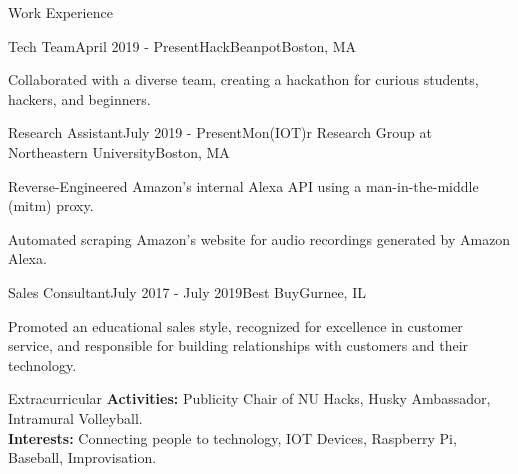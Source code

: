 \documentclass{resume}
\begin{document}
\begin{rSection}{Work Experience}

\begin{rSubsection}{Tech Team}{April 2019 - Present}{HackBeanpot}{Boston, MA}
\item Collaborated with a diverse team, creating a hackathon for curious students, hackers, and beginners.
\end{rSubsection}

\begin{rSubsection}{Research Assistant}{July 2019 - Present}{Mon(IOT)r Research Group at Northeastern University}{Boston, MA}
\item Reverse-Engineered Amazon's internal Alexa API using a man-in-the-middle (mitm) proxy. 
\item Automated scraping Amazon's website for audio recordings generated by Amazon Alexa.
\end{rSubsection}

\begin{rSubsection}{Sales Consultant}{July 2017 - July 2019}{Best Buy}{Gurnee, IL}
\item Promoted an educational sales style, recognized for excellence in customer service, and responsible for building relationships with customers and their technology.
\end{rSubsection}

\end{rSection}

\begin{rSection}{Extracurricular}\itemsep -5pt
{\bf Activities:}
Publicity Chair of NU Hacks, Husky Ambassador, Intramural Volleyball. \\
{\bf Interests:}
Connecting people to technology, IOT Devices, Raspberry Pi, Baseball, Improvisation.
\end{rSection}
\end{document}
